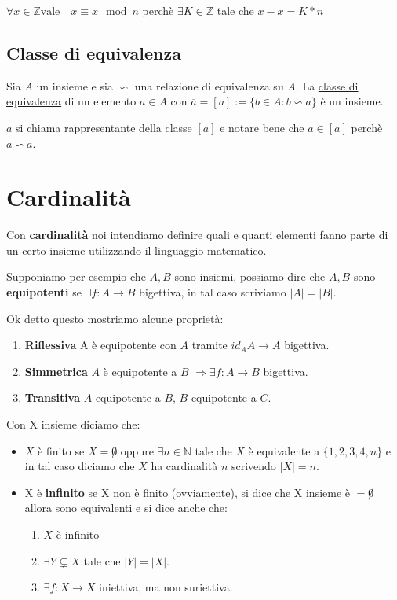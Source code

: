 \documentclass{article}
\begin{document}
$\forall x \in \mathbb{Z} \mbox{vale} \quad x \equiv x \mod n$ perchè $\exists K \in \mathbb{Z}$ tale che $x-x = K*n$ 


\subsection{Classe di equivalenza}
Sia $A$ un insieme e sia $\backsim$ una relazione di equivalenza su $A$. La \underline{classe di equivalenza} di un elemento $a \in A$ con $\overline{a} = [a] := \{b\in A : b \backsim a\}$ è un insieme. \par
$a$ si chiama rappresentante della classe $[a]$ e notare bene che $a \in [a]$ perchè $a \backsim a$.




\newpage
\section{Cardinalità}
Con \textbf{cardinalità} noi intendiamo definire quali e quanti elementi fanno parte di un certo insieme utilizzando il linguaggio matematico. \par

Supponiamo per esempio che $A,B$ sono insiemi, possiamo dire che $A,B$ sono \textbf{equipotenti} se $\exists f:A \rightarrow B$ bigettiva, in tal caso scriviamo $|A| = |B|$. \par

Ok detto questo mostriamo alcune proprietà:
\begin{enumerate}
        \item \textbf{Riflessiva} A è equipotente con $A$ tramite $id_A A \rightarrow A$ bigettiva.
        \item \textbf{Simmetrica} $A$ è equipotente a $B$ $\Rightarrow \exists f:A \rightarrow B$ bigettiva. 
        \item \textbf{Transitiva} $A$ equipotente a $B$, $B$ equipotente a $C$.	
\end{enumerate}

Con X insieme diciamo che:
\begin{itemize}
        \item $X$ è finito se $X = \not 0$ oppure $\exists n \in \mathbb{N}$ tale che $X$ è equivalente a $\{1,2,3,4,n\}$ e in tal caso diciamo che $X$ ha cardinalità $n$ scrivendo $|X| = n$.
        \item X è \textbf{infinito} se X non è finito (ovviamente), si dice che X insieme è $= \not 0$ allora sono equivalenti e si dice anche che:
        \begin{enumerate}
                \item$X$ è infinito
                \item $\exists Y \subsetneq X$ tale che $|Y|=|X|$.
                \item $\exists f:X \to X$ iniettiva, ma non suriettiva.
        \end{enumerate}
\end{itemize}
\end{document}
